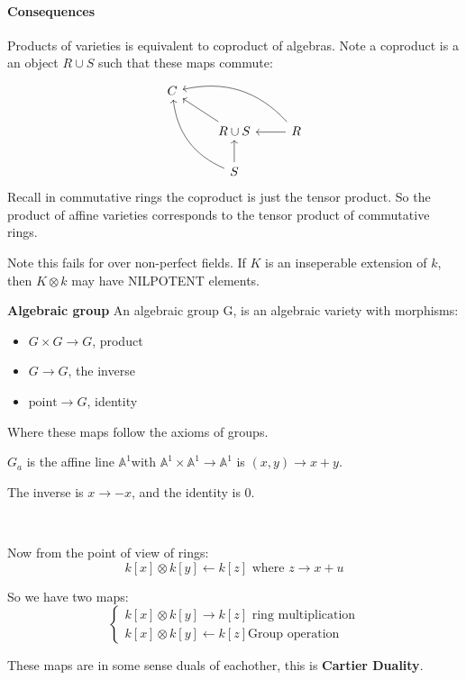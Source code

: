 \paragraph*{Consequences}
\begin{example}
    Products of varieties is equivalent to coproduct of algebras. Note a coproduct is a an object $R\cup S$ such that these maps commute:    \[\begin{tikzcd}
        C  & &\\
        & R\cup S \arrow[ul]  & \arrow[l] \arrow[ull, bend right] R \\
        & \arrow[uul, bend left] \arrow[u] S &
        \end{tikzcd}
        \]
Recall in commutative rings the coproduct is just the tensor product. So the product of affine varieties corresponds to the tensor product of commutative rings.

Note this fails for over non-perfect fields. If $K$ is an inseperable extension of $k$, then $K\otimes k$ may have NILPOTENT elements. 
\end{example}

\begin{definition}\textbf{Algebraic group}
    An algebraic group G, is an algebraic variety with morphisms:\begin{itemize}
        \item $G\times G\rightarrow G$, product
        \item $G\rightarrow G$, the inverse
        \item $\text{point}\rightarrow G$, identity
    \end{itemize}
    Where these maps follow the axioms of groups.
\end{definition}

\begin{example}
    $G_a$ is the affine line $\mathbb{A}^1$with $\mathbb{A}^1\times \mathbb{A}^1 \rightarrow \mathbb{A}^1$ is $(x,y)\rightarrow x+y$.

    The inverse is $x\rightarrow -x$, and the identity is $0$.

    \

    Now from the point of view of rings:\[k[x]\otimes k[y]\leftarrow k[z] \text{ where }z\rightarrow x+u\]

    So we have two maps:\[\begin{cases}
        k[x]\otimes k[y]\rightarrow k[z] \text{ ring multiplication}\\
        k[x]\otimes k[y]\leftarrow k[z]  \text{Group operation} 
    \end{cases}\] 

    These maps are in some sense duals of eachother, this is \textbf{Cartier Duality}.

\end{example}


